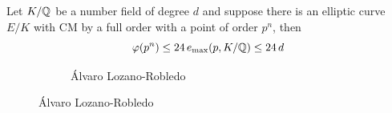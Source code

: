 \begin{frame}[plain]
\begin{thm}
Let $K/\mathbb{Q}$ be a number field of degree $d$ and suppose there is an elliptic curve $E/K$ with CM by a full order with a point of order $p^n$, then
	\[
	\varphi(p^n) \leq 24\, e_{\max}(p,K/\mathbb{Q}) \leq 24\, d
	\]
\end{thm}
	\begin{figure}[h]
	\centering
	\begin{subfigure}{\textwidth}
	\captionsetup{labelformat=empty}
	\centering
	\caption{\'Alvaro Lozano-Robledo}
	\end{subfigure}
	\end{figure}
\end{frame}



\begin{frame}[plain]
\end{frame}



